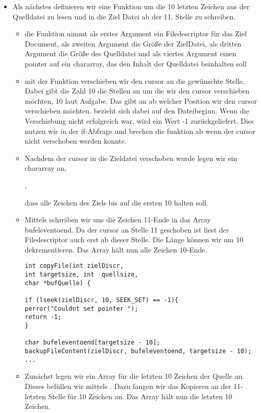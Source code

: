 \begin{itemize}
\begin{itemize}
\end{itemize}

\item Als nächstes definieren wir eine Funktion 
um die 10 letzten Zeichen aus der Quelldatei zu lesen und in die Ziel Datei ab der 11. Stelle zu schreiben.
\begin{itemize}
		\item die Funktion nimmt als erstes Argument ein Filedescriptor für das Ziel Document,
		als zweiten Argument die Größe der ZielDatei, als dritten Argument die Größe des Quelldatei
		und als viertes Argument einen pointer auf ein chararray, das den Inhalt der Quelldatei beinhalten soll
		\item mit der Funktion  verschieben wir den cursor an die
		gewünschte Stelle.
		Dabei gibt die Zahl 10 die Stellen an um die wir den cursor verschieben
		möchten, 10 laut Aufgabe. Das  gibt an ab welcher Position wir
		den cursor verschieben möchten.  bezieht sich dabei auf
		den Dateibeginn. Wenn die Verschiebung nicht erfolgreich war, wird ein Wert -1 zurückgeliefert.
		Dies nutzen wir in der if-Abfrage und brechen die funktion ab wenn der cursor nicht verschoben werden konnte.
		\item Nachdem der cursor in die Zieldatei verschoben wurde legen wir ein chararray an,

		,

		dass alle Zeichen des Ziels bis auf die ersten 10 halten soll.

		\item Mittels  schreiben wir uns die
		Zeichen 11-Ende in das Array bufeleventoend. Da der cursor an Stelle 11
		geschoben ist liest der Filedescriptor auch erst ab dieser Stelle.
		Die Länge können wir um 10 dekrementieren.
		Das Array hält nun alle Zeichen 10-Ende.

	\begin{lstlisting}
int copyFile(int zielDiscr,
int targetsize, int  quellsize,
char *bufQuelle) {

if (lseek(zielDiscr, 10, SEEK_SET) == -1){
perror("Couldnt set pointer ");
return -1;
}

char bufeleventoend[targetsize - 10];
backupFileContent(zielDiscr, bufeleventoend, targetsize - 10);
...
	\end{lstlisting}

	\item Zunächst legen wir ein Array für die letzten 10 Zeichen
	der Quelle an.
	Dieses befüllen wir mittels . Dazu fangen wir das
	Kopieren an der 11-letzten Stelle für 10 Zeichen an. Das Array hält nun
	die letzten 10 Zeichen.


\end{itemize}
\end{itemize}
